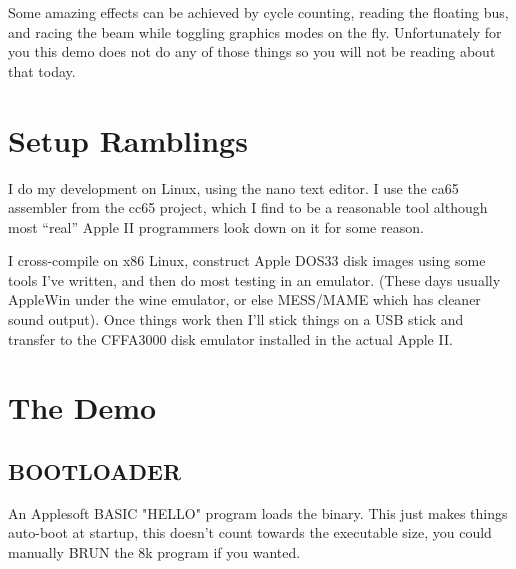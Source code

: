 \documentclass[twocolumn]{article}
\begin{document}
	Some amazing effects can be achieved by cycle counting, reading
	the floating bus, and racing the beam while toggling graphics
	modes on the fly.
	Unfortunately for you this demo does not do any of those things
	so you will not be reading about that today.




\section{Setup Ramblings}

I do my development on Linux, using the nano text editor.  I use the
ca65 assembler from the cc65 project, which I find to be a reasonable
tool although most ``real'' Apple II programmers look down on it for some
reason.

I cross-compile on x86 Linux, construct Apple DOS33 disk images using
some tools I've written, and then do most testing in an emulator.
(These days usually AppleWin under the wine emulator, or else MESS/MAME
which has cleaner sound output).  Once things work then I'll stick things
on a USB stick and transfer to the CFFA3000 disk emulator installed in
the actual Apple II.

%






\section{The Demo}

\subsection{BOOTLOADER}

   An Applesoft BASIC "HELLO" program loads the binary.
   This just makes things auto-boot at startup, this doesn't count
   towards the executable size, you could manually BRUN the 8k program
   if you wanted.
\end{document}
